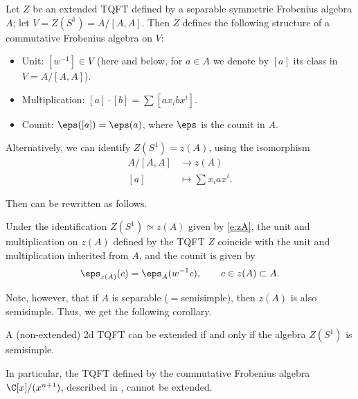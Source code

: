 \begin{theorem}\label{t:centerTQFT}
  Let $Z$ be an extended TQFT defined by a separable symmetric Frobenius algebra
  $A$; let $V=Z(S^1)=A/[A,A]$. Then $Z$ defines the following structure of
  a commutative Frobenius algebra on $V$:
  \begin{itemize}
    \item Unit: $[w^{-1}]\in V$ \textup{(}here and below, for $a\in A$ we denote by
        $[a]$ its class in $V=A/[A,A]$\textup{)}.
    \item Multiplication: $[a]\cdot [b]=\sum [ax_ibx^i]$.
    \item Counit: $\eps([a])=\eps (a)$, where $\eps$ is the counit in $A$.
  \end{itemize}
\end{theorem}

Alternatively, we can identify $Z(S^1)=z(A)$, using the isomorphism
\begin{equation}\label{e:zA}
  \begin{aligned}
    A/[A,A]&\to z(A)\\
     [a]&\mapsto \sum x_iax^i.
   \end{aligned}
\end{equation}

Then  can be rewritten as follows.
\begin{theorem} \label{t:centerTQFT2}
  Under the identification $Z(S^1)\simeq z(A)$ given by \eqref{e:zA},
  the unit and multiplication on $z(A)$ defined by the TQFT $Z$ coincide with the unit and
  multiplication inherited from $A$, and the counit is given by
  $$
    \eps_{z(A)} (c)=\eps_A(w^{-1}c), \qquad c\in z(A)\subset A.
  $$
\end{theorem}


Note, however, that if $A$ is separable ($=$semisimple), then $z(A)$ is
also semisimple. Thus, we get the following corollary.
\begin{corollary}
  A \textup{(}non-extended\textup{)} 2d TQFT can be extended if and only if the algebra $Z(S^1)$
  is semisimple.
\end{corollary}
In particular, the TQFT defined by the commutative
Frobenius algebra $\C[x]/(x^{n+1})$, described in ,
cannot be extended.

